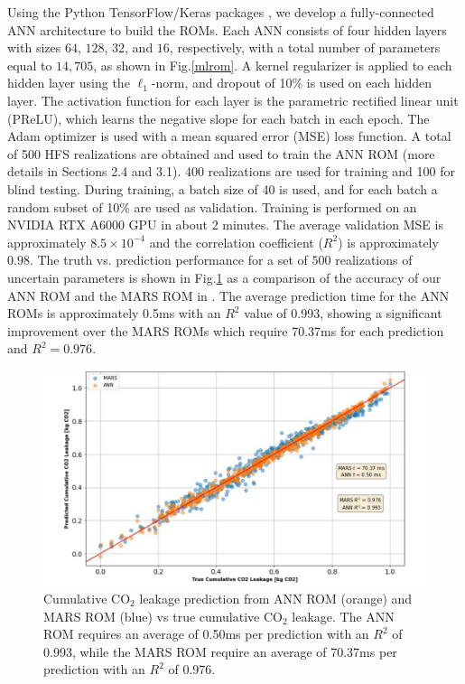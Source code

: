 \documentclass[a4paper,fleqn]{cas-sc}
\begin{document}
Using the Python TensorFlow/Keras packages \citep{chollet2015keras}, we develop a fully-connected ANN architecture to build the ROMs. Each ANN consists of four hidden layers with sizes $64$, $128$, $32$, and $16$, respectively, with a total number of parameters equal to $14,705$, as shown in Fig.\ref{mlrom}. A kernel regularizer is applied to each hidden layer using the $\ell_1$-norm, and dropout of 10\% is used on each hidden layer. The activation function for each layer is the parametric rectified linear unit (PReLU), which learns the negative slope for each batch in each epoch. The Adam optimizer is used with a mean squared error (MSE) loss function. A total of 500 HFS realizations are obtained and used to train the ANN ROM (more details in Sections 2.4 and 3.1). 400 realizations are used for training and 100 for blind testing. During training, a batch size of 40 is used, and for each batch a random subset of 10\% are used as validation. Training is performed on an NVIDIA RTX A$6000$ GPU in about $2$ minutes. The average validation MSE is approximately $8.5\times10^{-4}$ and the correlation coefficient ($R^2$) is approximately $0.98$. The truth vs. prediction performance for a set of $500$ realizations of uncertain parameters is shown in Fig.\ref{rom_train} as a comparison of the accuracy of our ANN ROM and the MARS ROM in \citet{Chen2018}. The average prediction time for the ANN ROMs is approximately 0.5ms with an $R^2$ value of 0.993, showing a significant improvement over the MARS ROMs which require 70.37ms for each prediction and $R^2=0.976$.

\begin{figure}[h]
    \centering
    \includegraphics[width=0.7\linewidth]{figs/Figure 3.pdf}
    \caption{Cumulative CO$_2$ leakage prediction from ANN ROM (orange) and MARS ROM (blue) vs true cumulative CO$_2$ leakage. The ANN ROM requires an average of 0.50ms per prediction with an $R^2$ of 0.993, while the MARS ROM require an average of 70.37ms per prediction with an $R^2$ of 0.976.}
    \label{rom_train}
\end{figure}
\end{document}
